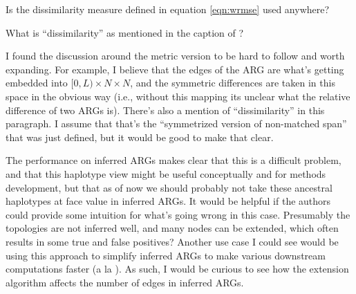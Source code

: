 \begin{point}{}
 Is the dissimilarity measure defined in equation \eqref{eqn:wrmse} used anywhere?
\end{point}


\begin{point}{}
 What is ``dissimilarity'' as mentioned in the caption of ?
\end{point}


\begin{point}{\revref}
 I found the discussion around the metric version to be hard to follow and worth expanding.
For example, I believe that the edges of the ARG are what's getting embedded into
$[0, L) \times N \times N$, and the symmetric differences are taken in this space in the obvious way (i.e., without this mapping its unclear what the relative difference of two ARGs is).
There's also a mention of ``dissimilarity'' in this paragraph. I assume that that's the ``symmetrized version of non-matched span'' that was just defined, but it would be good to make that clear. 
\end{point}


\begin{point}{}
 The performance on inferred ARGs makes clear that this is a difficult problem, and that this haplotype view might be useful conceptually and for methods development, but that as of now we should probably not take these ancestral haplotypes at face value in inferred ARGs. It would be helpful if the authors could provide some intuition for what's going wrong in this case. Presumably the topologies are not inferred well, and many nodes can be extended, which often results in some true and false positives? Another use case I could see would be using this approach to simplify inferred ARGs to make various downstream computations faster (a la ). As such, I would be curious to see how the extension algorithm affects the number of edges in inferred ARGs.
\end{point}

